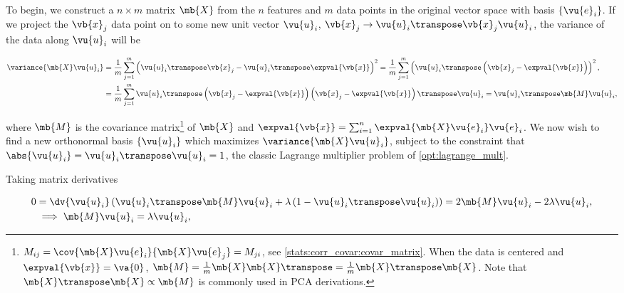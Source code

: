 To begin, we construct a $n \times m$ matrix $\mb{X}$
from the $n$ features and $m$ data points in the original vector space
with basis $\left\{\vu{e}_{i}\right\}$.
If we project the $\vb{x}_{j}$ data point on to
some new unit vector $\vu{u}_{i}$,
$\vb{x}_{j} \to \vu{u}_{i}\transpose \vb{x}_{j} \vu{u}_{i}$,
the variance of the data along $\vu{u}_{i}$ will be

\begin{subequations}\label{eq:PCA:variance}
\begin{align}
\variance{\mb{X} \vu{u}_{i}}
&= \frac{1}{m}\sum_{j=1}^{m} \left(
\vu{u}_{i}\transpose \vb{x}_{j}
-
\vu{u}_{i}\transpose \expval{\vb{x}}
\right)^{2}
= \frac{1}{m}\sum_{j=1}^{m} \left( \vu{u}_{i}\transpose \left(\vb{x}_{j} - \expval{\vb{x}}\right)\right)^{2}, \label{eq:PCA:variance:a} \\
&= \frac{1}{m}\sum_{j=1}^{m}
\vu{u}_{i}\transpose
\left(\vb{x}_{j} - \expval{\vb{x}}\right)
\left(\vb{x}_{j} - \expval{\vb{x}}\right)\transpose
\vu{u}_{i}
= \vu{u}_{i}\transpose \mb{M} \vu{u}_{i}, \label{eq:PCA:variance:M}
\end{align}
\end{subequations}

\noindent where $\mb{M}$ is
the covariance matrix\footnote{$M_{ij} = \cov{\mb{X} \vu{e}_{i}}{\mb{X} \vu{e}_{j}} = M_{ji}$,
see \cref{stats:corr_covar:covar_matrix}.
When the data is centered and $\expval{\vb{x}} = \va{0}$,
$\mb{M} = \frac{1}{m} \mb{X} \mb{X}\transpose = \frac{1}{m} \mb{X}\transpose \mb{X}$.
Note that $\mb{X}\transpose \mb{X} \propto \mb{M}$
is commonly used in PCA derivations.} of $\mb{X}$
and $\expval{\vb{x}} = \sum_{i=1}^{n} \expval{\mb{X} \vu{e}_{i}} \vu{e}_{i}$.
We now wish to find a new orthonormal basis $\left\{\vu{u}_{i}\right\}$
which maximizes $\variance{\mb{X} \vu{u}_{i}}$,
subject to the constraint that $\abs{\vu{u}_{i}} = \vu{u}_{i}\transpose \vu{u}_{i} = 1$,
\ie the classic Lagrange multiplier problem of \cref{opt:lagrange_mult}.

Taking matrix derivatives

\begin{subequations}\label{eq:PCA:lagrange}
\begin{align}
0 &= \dv{\vu{u}_{i}} \left( \vu{u}_{i}\transpose \mb{M} \vu{u}_{i}
+ \lambda \left( 1 - \vu{u}_{i}\transpose \vu{u}_{i} \right) \right)
= 2 \mb{M} \vu{u}_{i} - 2 \lambda \vu{u}_{i}, \label{eq:PCA:lagrange:setup} \\
&\implies \mb{M}\vu{u}_{i} = \lambda \vu{u}_{i}, \label{eq:PCA:lagrange:eigen}
\end{align}
\end{subequations}

